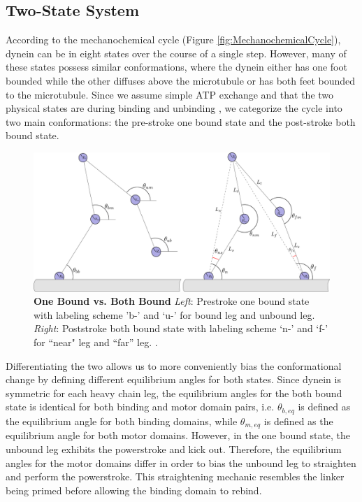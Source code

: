 \subsection{Two-State System}
According to the mechanochemical cycle (Figure \ref{fig:MechanochemicalCycle}), dynein can be in eight states over the course of a single step. However, many of these states possess similar conformations, where the dynein either has one foot bounded while the other diffuses above the microtubule or has both feet bounded to the microtubule. Since we assume simple ATP exchange and that the two physical states are during binding and unbinding \cite{}, we categorize the cycle into two main conformations: the pre-stroke one bound state and the post-stroke both bound state.

\begin{figure}[H]
	\centering
	\includegraphics[width=0.9\columnwidth]{Figures/OB_vs_BB.PNG}
	\caption[One Bound vs. Both Bound]{\textbf{One Bound vs. Both Bound} \textit{Left}: Prestroke one bound state with labeling scheme 'b-’ and ‘u-’ for bound leg and unbound leg. \textit{Right}: Poststroke both bound state with labeling scheme ‘n-’ and ‘f-’ for ``near" leg and ``far'' leg. \cite{Capek2017}.}
	\label{fig:OBvsBB}
\end{figure}

Differentiating the two allows us to more conveniently bias the conformational change by defining different equilibrium angles for both states. Since dynein is symmetric for each heavy chain leg, the equilibrium angles for the both bound state is identical for both binding and motor domain pairs, i.e. $\theta_{b,eq}$ is defined as the equilibrium angle for both binding domains, while $\theta_{m,eq}$ is defined as the equilibrium angle for both motor domains. However, in the one bound state, the unbound leg exhibits the powerstroke and kick out. Therefore, the equilibrium angles for the motor domains differ in order to bias the unbound leg to straighten and perform the powerstroke. This straightening mechanic resembles the linker being primed before allowing the binding domain to rebind.


